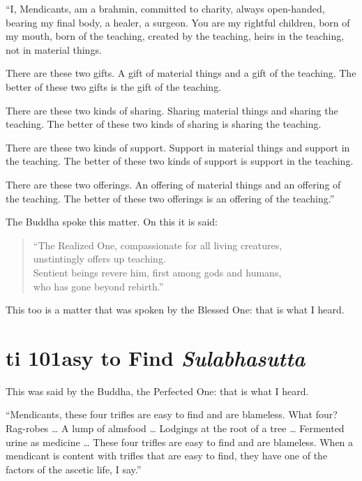 \documentclass[12pt,openany]{book}%
\newcommand*{\suttatitleacronym}[1]{\smaller[2]{#1}\vspace*{.3em}}
\newcommand*{\suttatitletranslation}[1]{\linebreak{#1}}
\newcommand*{\suttatitleroot}[1]{\linebreak\smaller[2]\itshape{#1}}
\newcommand*{\tocacronym}[1]{\hspace*{-3.3em}{#1}\quad}
\newcommand*{\toctranslation}[1]{#1}
\newcommand*{\tocroot}[1]{(\textit{#1})}
\begin{document}
“I, Mendicants, am a brahmin, committed to charity, always open-handed, bearing my final body, a healer, a surgeon. You are my rightful children, born of my mouth, born of the teaching, created by the teaching, heirs in the teaching, not in material things. 

There are these two gifts. A gift of material things and a gift of the teaching. The better of these two gifts is the gift of the teaching. 

There are these two kinds of sharing. Sharing material things and sharing the teaching. The better of these two kinds of sharing is sharing the teaching. 

There are these two kinds of support. Support in material things and support in the teaching. The better of these two kinds of support is support in the teaching. 

There are these two offerings. An offering of material things and an offering of the teaching. The better of these two offerings is an offering of the teaching.” 

The Buddha spoke this matter. On this it is said: 

\begin{verse}%
“The Realized One, compassionate for all living creatures, \\
unstintingly offers up teaching. \\
Sentient beings revere him, first among gods and humans, \\
who has gone beyond rebirth.” 

%
\end{verse}

This too is a matter that was spoken by the Blessed One: that is what I heard. 

%
\section*{{\suttatitleacronym Iti 101}{\suttatitletranslation Easy to Find }{\suttatitleroot Sulabhasutta}}
\addcontentsline{toc}{section}{\tocacronym{Iti 101} \toctranslation{Easy to Find } \tocroot{Sulabhasutta}}

This was said by the Buddha, the Perfected One: that is what I heard. 

“Mendicants, these four trifles are easy to find and are blameless. What four? Rag-robes … A lump of almsfood … Lodgings at the root of a tree … Fermented urine as medicine … These four trifles are easy to find and are blameless. When a mendicant is content with trifles that are easy to find, they have one of the factors of the ascetic life, I say.” 
\end{document}
